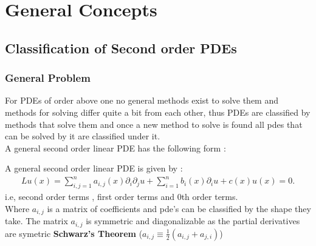 \chapter{General Concepts}
\section{Classification of Second order PDEs} %
\subsection{General Problem} %
\label{sub:General Problem}
For PDEs of order above one no general methods exist to solve them
and methods for solving differ quite a bit from each other,
thus PDEs are classified by methods that solve them and once
a new method to solve is found all pdes that can be solved
by it are classified under it.\\[1ex]

A general second order linear PDE has the following form :
\begin{definition}
	A general second order linear PDE is given by :
	\begin{align*}
		Lu(x) = \sum_{i,j=1}^{n}  a_{i,j}(x) \partial_i \partial_j u +  \sum_{i=1}^{n}  b_{i}(x) \partial_i u + c(x)u(x) = 0
		.\end{align*}
	i.e, second order terms , first order terms and 0th order terms. \\[1ex]
	Where $a_{i,j}$ is a matrix of coefficients and pde's can be classified by the shape they take.
	The matrix $a_{i,j}$ is symmetric and diagonalizable as the partial derivatives are symetric \textbf{Schwarz's Theorem} ($a_{i,j} \equiv \frac{1}{2}(a_{i,j} + a_{j,i})$)
\end{definition}
\label{sec:Classification of Second order PDEs}
